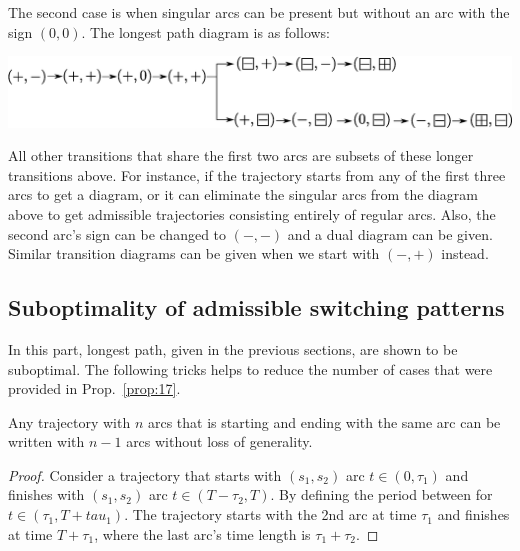 The second case is when singular arcs can be present but without an arc with the sign $(0,0)$. The longest path diagram is as follows:

\begin{center}
	\includegraphics[width=\textwidth]{fig/case_ii.eps}
\end{center}

All other transitions that share the first two arcs are subsets of these longer transitions above. 
For instance, if the trajectory starts from any of the first three arcs to get a diagram, or it can eliminate the singular arcs from the diagram above to get admissible trajectories consisting entirely of regular arcs. Also, the second arc's sign can be changed to $(-,-)$ and a dual diagram can be given. 
Similar transition diagrams can be given when we start with $(-,+)$ instead.

\subsection{Suboptimality of admissible switching patterns}
%
In this part, longest path, given in the previous sections, are shown to be suboptimal.
 The following tricks helps to reduce the number of cases that were provided in Prop.~\ref{prop:17}.

\begin{lemma} \label{lemma:18}
	Any trajectory with $n$ arcs that is starting and ending with the same arc can be written with $n-1$ arcs without loss of generality.
\end{lemma}
%
\begin{proof}
	Consider a trajectory that starts with $(s_1, s_2)$ arc $t\in(0,\tau_1)$ and finishes with $(s_1, s_2)$ arc $t\in(T-\tau_2,T)$. 
	By defining the period between for $t\in(\tau_1,T+tau_1)$. 
	The trajectory starts with the 2nd arc at time $\tau_1$ and finishes at time $T+\tau_1$, where the last arc's time length is $\tau_1+\tau_2$.
\end{proof}

